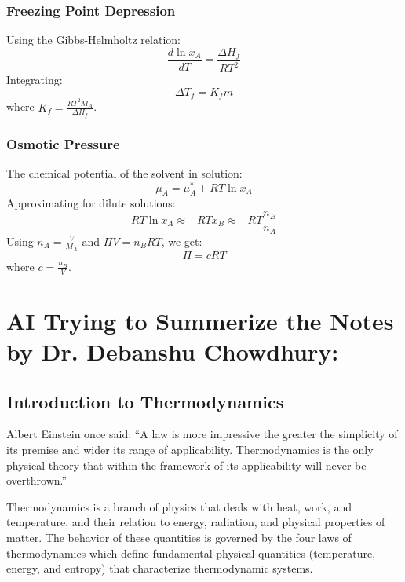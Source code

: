 \documentclass{article}
\theoremstyle{definition}
\begin{document}
\subsubsection{Freezing Point Depression}
Using the Gibbs-Helmholtz relation:
\begin{equation}
    \frac{d \ln x_A}{dT} = \frac{\Delta H_f}{RT^2}
\end{equation}
Integrating:
\begin{equation}
    \Delta T_f = K_f m
\end{equation}
where \( K_f = \frac{RT^2 M_A}{\Delta H_f} \).

\subsubsection{Osmotic Pressure}
The chemical potential of the solvent in solution:
\begin{equation}
    \mu_A = \mu_A^* + RT \ln x_A
\end{equation}
Approximating for dilute solutions:
\begin{equation}
    RT \ln x_A \approx -RT x_B \approx -RT \frac{n_B}{n_A}
\end{equation}
Using \( n_A = \frac{V}{M_A} \) and \( \Pi V = n_B RT \), we get:
\begin{equation}
    \Pi = cRT
\end{equation}
where \( c = \frac{n_B}{V} \).

\section{AI Trying to Summerize the Notes by Dr. Debanshu Chowdhury:}

\subsection{Introduction to Thermodynamics}

Albert Einstein once said: ``A law is more impressive the greater the simplicity of its premise and wider its range of applicability. Thermodynamics is the only physical theory that within the framework of its applicability will never be overthrown.''

Thermodynamics is a branch of physics that deals with heat, work, and temperature, and their relation to energy, radiation, and physical properties of matter. The behavior of these quantities is governed by the four laws of thermodynamics which define fundamental physical quantities (temperature, energy, and entropy) that characterize thermodynamic systems.
\end{document}
